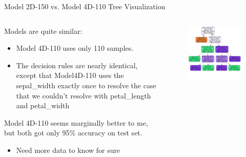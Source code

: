 \documentclass[aspectratio=169]{../latex_main/tntbeamer}  %
\begin{document}
	
	\begin{frame}{Model 2D-150 vs. Model 4D-110 Tree Visualization}
	    \begin{columns}
	        \begin{column}{.5\textwidth}
	                Models are quite similar:
	                \begin{itemize}
	                    \item Model 4D-110 uses only 110 samples.
	                    \item The decision rules are nearly identical, except that Model4D-110 uses the sepal\_width exactly once to resolve the case that we couldn’t resolve with petal\_length and petal\_width
	                \end{itemize}
	                Model 4D-110 seems marginally better to me, but both got only 95\% accuracy on test set. 
	                \begin{itemize}
	                    \item Need more data to know for sure
	                \end{itemize}
	        \end{column}
	   
	        \begin{column}{.5\textwidth}
	                \begin{figure}
	                    \includegraphics[scale=.33]{Bild35}
	                \end{figure}
	        \end{column}
	    \end{columns}
	 
	\end{frame}
	
\end{document}
